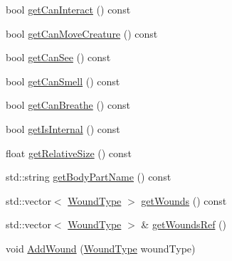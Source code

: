\begin{DoxyCompactItemize}
\item 
bool \mbox{\hyperlink{class_body_part_a9a53de5a283928eb78986c3195d0f1b9}{get\+Can\+Interact}} () const
\item 
bool \mbox{\hyperlink{class_body_part_a77da57c41bc2b7bde4f35d13298224ca}{get\+Can\+Move\+Creature}} () const
\item 
bool \mbox{\hyperlink{class_body_part_ab1a17aec7b3aa4d388fb9c8421cdc519}{get\+Can\+See}} () const
\item 
bool \mbox{\hyperlink{class_body_part_a9a954b18bd4bee1a8a2dea9d3464fd29}{get\+Can\+Smell}} () const
\item 
bool \mbox{\hyperlink{class_body_part_a9bbc06713cb6b2d0c6c978e5b307d85b}{get\+Can\+Breathe}} () const
\item 
bool \mbox{\hyperlink{class_body_part_a9a7b684a14febfb06d1c5abfdc99ed89}{get\+Is\+Internal}} () const
\item 
float \mbox{\hyperlink{class_body_part_a195def981a8f414a0456c9dfb2a70c0d}{get\+Relative\+Size}} () const
\item 
std\+::string \mbox{\hyperlink{class_body_part_af5a68e571235e6b4e8cd6a13ec94bab3}{get\+Body\+Part\+Name}} () const
\item 
std\+::vector$<$ \mbox{\hyperlink{_enum_types_8hpp_a585daaeecd1f9f1350c24bf0081a734e}{Wound\+Type}} $>$ \mbox{\hyperlink{class_body_part_a14b7007a9ddb15b7e3f5c6881dbf69d5}{get\+Wounds}} () const
\item 
std\+::vector$<$ \mbox{\hyperlink{_enum_types_8hpp_a585daaeecd1f9f1350c24bf0081a734e}{Wound\+Type}} $>$ \& \mbox{\hyperlink{class_body_part_a3363f4c49d3f12175dd17fa01196ac17}{get\+Wounds\+Ref}} ()
\item 
void \mbox{\hyperlink{class_body_part_a796eab925725be8a3bba686958677789}{Add\+Wound}} (\mbox{\hyperlink{_enum_types_8hpp_a585daaeecd1f9f1350c24bf0081a734e}{Wound\+Type}} wound\+Type)
\end{DoxyCompactItemize}
